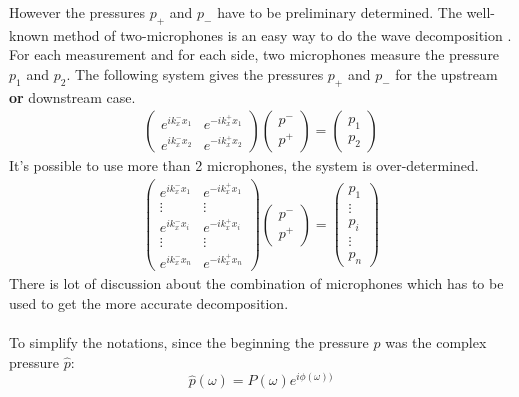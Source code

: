 However the pressures $p_+$ and $p_-$ have to be preliminary determined. The well-known method of two-microphones is an easy way to do the wave decomposition \cite{Boden_2micros}.  
For each measurement and for each side, two microphones measure the pressure $p_1$ and $p_2$. 
The following system gives the pressures $p_+$ and $p_-$ for the upstream \textbf{or} downstream case.
\begin{gather}
    \begin{pmatrix}
      e^{ik_x^-x_1} & e^{-ik_x^+x_1} \\
      e^{ik_x^-x_2} & e^{-ik_x^+x_2}
    \end{pmatrix}
    \begin{pmatrix}
       p^-\\
       p^+
    \end{pmatrix}
    =
    \begin{pmatrix}
      p_1 \\
      p_2 
    \end{pmatrix}
 \end{gather}
It's possible to use more than 2 microphones, the system is over-determined.
 \begin{gather}
    \begin{pmatrix}
      e^{ik_x^-x_1} & e^{-ik_x^+x_1} \\
      \vdots & \vdots\\
      e^{ik_x^-x_i} & e^{-ik_x^+x_i}\\
      \vdots & \vdots\\
      e^{ik_x^-x_n} & e^{-ik_x^+x_n}
    \end{pmatrix}
    \begin{pmatrix}
       p^-\\
       p^+
    \end{pmatrix}
    =
    \begin{pmatrix}
      p_1 \\
      \vdots\\
      p_i \\
      \vdots\\
      p_n
    \end{pmatrix}
 \end{gather}
 There is lot of discussion about the combination of microphones which has to be used to get the more accurate decomposition.\\
 \\
To simplify the notations, since the beginning the pressure $p$ was the complex pressure $\hat{p}$:
\begin{equation}
    \hat{p}(\omega)=P(\omega)e^{i\phi(\omega))}
\end{equation}
